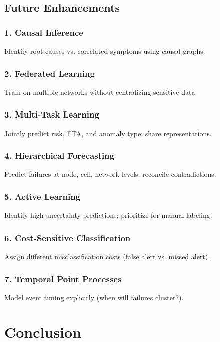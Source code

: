 \documentclass[11pt,a4paper,oneside]{report}
\begin{document}
\section{Future Enhancements}

\subsection{1. Causal Inference}
Identify root causes vs. correlated symptoms using causal graphs.

\subsection{2. Federated Learning}
Train on multiple networks without centralizing sensitive data.

\subsection{3. Multi-Task Learning}
Jointly predict risk, ETA, and anomaly type; share representations.

\subsection{4. Hierarchical Forecasting}
Predict failures at node, cell, network levels; reconcile contradictions.

\subsection{5. Active Learning}
Identify high-uncertainty predictions; prioritize for manual labeling.

\subsection{6. Cost-Sensitive Classification}
Assign different misclassification costs (false alert vs. missed alert).

\subsection{7. Temporal Point Processes}
Model event timing explicitly (when will failures cluster?).

\newpage

\chapter{Conclusion}
\end{document}
